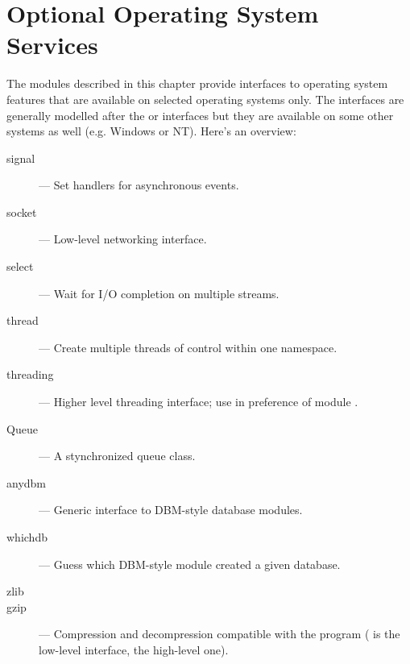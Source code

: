 \chapter{Optional Operating System Services}
\label{someos}

The modules described in this chapter provide interfaces to operating
system features that are available on selected operating systems only.
The interfaces are generally modelled after the \UNIX{} or \C{}
interfaces but they are available on some other systems as well
(e.g. Windows or NT).  Here's an overview:

\begin{description}

\item[signal]
--- Set handlers for asynchronous events.

\item[socket]
--- Low-level networking interface.

\item[select]
--- Wait for I/O completion on multiple streams.

\item[thread]
--- Create multiple threads of control within one namespace.

\item[threading]
--- Higher level threading interface; use in preference of module
.

\item[Queue]
--- A stynchronized queue class.

\item[anydbm]
--- Generic interface to DBM-style database modules.

\item[whichdb]
--- Guess which DBM-style module created a given database.

\item[zlib]
\item[gzip]
--- Compression and decompression compatible with the
 program ( is the low-level interface,
 the high-level one).

\end{description}
